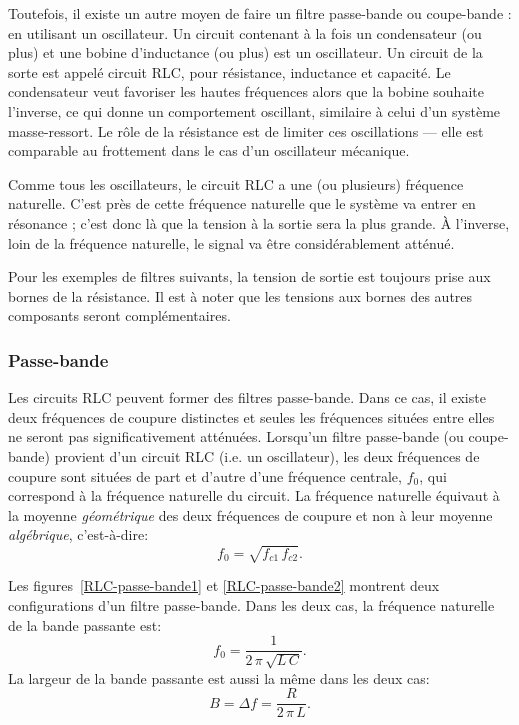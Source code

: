 \documentclass[12pt,oneside,letterpaper]{article}
\begin{document}
Toutefois, il existe un autre moyen de faire un filtre passe-bande ou coupe-bande : en utilisant un oscillateur. Un circuit contenant à la fois un condensateur (ou plus) et une bobine d'inductance (ou plus) est un oscillateur. Un circuit de la sorte est appelé circuit RLC, pour résistance, inductance et capacité. Le condensateur veut favoriser les hautes fréquences alors que la bobine souhaite l'inverse, ce qui donne un comportement oscillant, similaire à celui d'un système masse-ressort. Le rôle de la résistance est de limiter ces oscillations --- elle est comparable au frottement dans le cas d'un oscillateur mécanique.

Comme tous les oscillateurs, le circuit RLC a une (ou plusieurs) fréquence naturelle. C'est près de cette fréquence naturelle que le système va entrer en résonance ; c'est donc là que la tension à la sortie sera la plus grande. À l'inverse, loin de la fréquence naturelle, le signal va être considérablement atténué.

Pour les exemples de filtres suivants, la tension de sortie est toujours prise aux bornes de la résistance. Il est à noter que les tensions aux bornes des autres composants seront complémentaires.


\subsubsection{Passe-bande}

Les circuits RLC peuvent former des filtres passe-bande. Dans ce cas, il existe deux fréquences de coupure distinctes et seules les fréquences situées entre elles ne seront pas significativement atténuées. Lorsqu'un filtre passe-bande (ou coupe-bande) provient d'un circuit RLC (i.e. un oscillateur), les deux fréquences de coupure sont situées de part et d'autre d'une fréquence centrale, $f_0$, qui correspond à la fréquence naturelle du circuit. La fréquence naturelle équivaut à la moyenne \textit{géométrique} des deux fréquences de coupure et non à leur moyenne \textit{algébrique}, c'est-à-dire:
\begin{equation}
f_0=\sqrt{f_{c1}\,f_{c2}}.
\end{equation}

Les figures~\ref{RLC-passe-bande1} et \ref{RLC-passe-bande2} montrent deux configurations d'un filtre passe-bande. Dans les deux cas, la fréquence naturelle de la bande passante est:
\begin{equation}
\label{eq-passe-bande1}
f_0=\frac{1}{2\,\pi\,\sqrt{L\,C}}.
\end{equation}
La largeur de la bande passante est aussi la même dans les deux cas:
\begin{equation}
\label{eq-passe-bande2}
B=\Delta f=\frac{R}{2\,\pi\,L}.
\end{equation}
\end{document}
